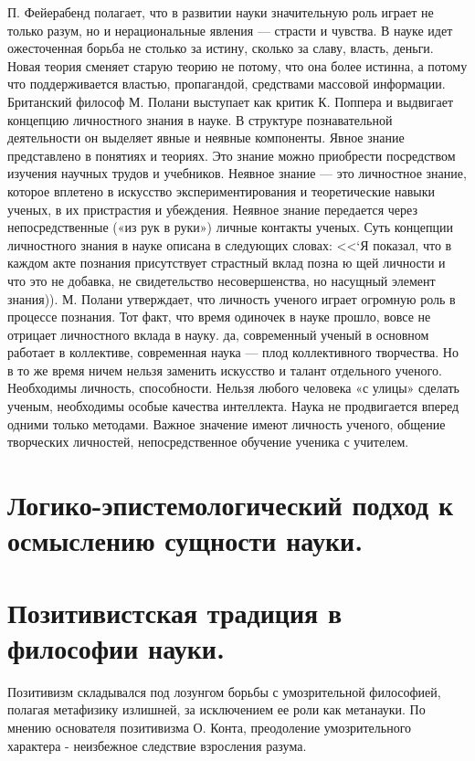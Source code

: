 \documentclass[12pt, specialist, subf, substylefile = spbu.rtx]{disser}
\begin{document}
П. Фейерабенд полагает, что в развитии науки значительную роль играет не только разум, но и нерациональные явления — страсти и чувства. В науке идет ожесточенная борьба не столько за истину, сколько за славу, власть, деньги. Новая теория сменяет старую теорию не потому, что она более истинна, а потому что поддерживается властью, пропагандой, средствами массовой информации. 
Британский философ М. Полани выступает как критик К. Поппера и выдвигает концепцию личностного знания в науке. В структуре познавательной деятельности он выделяет явные и неявные компоненты. Явное знание представлено в понятиях и теориях. Это знание можно приобрести посредством изучения научных трудов и учебников. Неявное знание — это личностное знание, которое вплетено в искусство экспериментирования и теоретические навыки ученых, в их пристрастия и убеждения. Неявное знание передается через непосредственные («из рук в руки») личные контакты ученых. Суть концепции личностного знания в науке описана в следующих словах: <<‘Я показал, что в каждом акте познания присутствует страстный вклад позна ю щей личности и что это не добавка, не свидетельство несовершенства, но насущный элемент знания)). 
М. Полани утверждает, что личность ученого играет огромную роль в процессе познания. Тот факт, что время одиночек в науке прошло, вовсе не отрицает личностного вклада в науку. да, современный ученый в основном работает в коллективе, современная наука — плод коллективного творчества. Но в то же время ничем нельзя заменить искусство и талант отдельного ученого. Необходимы личность, способности. Нельзя любого человека «с улицы» сделать ученым, необходимы особые качества интеллекта. Наука не продвигается вперед одними только методами. Важное значение имеют личность ученого, общение творческих личностей, непосредственное обучение ученика с учителем. 

\section{Логико-эпистемологический подход к осмыслению сущности науки.}

\section{Позитивистская традиция в философии науки.}
Позитивизм складывался под лозунгом борьбы с умозрительной философией, полагая метафизику излишней, за исключением ее роли как метанауки. По мнению основателя позитивизма О. Конта, преодоление умозрительного характера - неизбежное следствие взросления разума.
\end{document}

